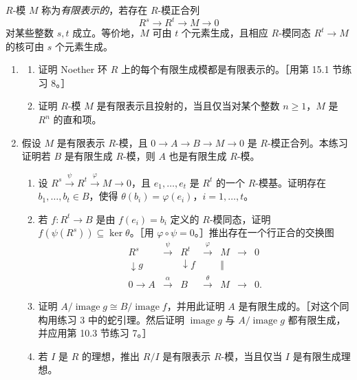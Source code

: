 $R$-模 $M$ 称为\emph{有限表示的}，若存在 $R$-模正合列
\[
  R^s\to R^t\to M\to0
\]
对某些整数 $s,t$ 成立。等价地，$M$ 可由 $t$ 个元素生成，且相应 $R$-模同态 $R^t\to M$ 的核可由 $s$ 个元素生成。

\begin{enumerate}[label=\arabic*.,resume]
  \item \begin{enumerate}[label=(\alph*)]
    \item 证明 Noether 环 $R$ 上的每个有限生成模都是有限表示的。［用第 15.1 节练习 8。］
    \item 证明 $R$-模 $M$ 是有限表示且投射的，当且仅当对某个整数 $n\geq1$，$M$ 是 $R^n$ 的直和项。
  \end{enumerate}

  \item 假设 $M$ 是有限表示 $R$-模，且 $0\to A\to B\to M\to0$ 是 $R$-模正合列。本练习证明若 $B$ 是有限生成 $R$-模，则 $A$ 也是有限生成 $R$-模。
  \begin{enumerate}[label=(\alph*)]
    \item 设 $R^s\xrightarrow{\psi}R^t\xrightarrow{\varphi}M\to0$，且 $e_1,\ldots,e_t$ 是 $R^t$ 的一个 $R$-模基。证明存在 $b_1,\ldots,b_t\in B$，使得 $\theta(b_i)=\varphi(e_i)$，$i=1,\ldots,t$。
    \item 若 $f:R^t\to B$ 是由 $f(e_i)=b_i$ 定义的 $R$-模同态，证明 $f(\psi(R^s))\subseteq\ker\theta$。［用 $\varphi\circ\psi=0$。］推出存在一个行正合的交换图
    \[
    \begin{array}{ccccccccc}
    R^s&\xrightarrow{\psi}&R^t&\xrightarrow{\varphi}&M&\to&0\\
    \downarrow g&&\downarrow f&&\Vert&&\\
    0\to A&\xrightarrow{\alpha}&B&\xrightarrow{\theta}&M&\to&0 .
    \end{array}
    \]
    \item 证明 $A/\operatorname{image}g\cong B/\operatorname{image}f$，并用此证明 $A$ 是有限生成的。［对这个同构用练习 3 中的蛇引理。然后证明 $\operatorname{image}g$ 与 $A/\operatorname{image}g$ 都有限生成，并应用第 10.3 节练习 7。］
    \item 若 $I$ 是 $R$ 的理想，推出 $R/I$ 是有限表示 $R$-模，当且仅当 $I$ 是有限生成理想。
  \end{enumerate}


\end{enumerate}
